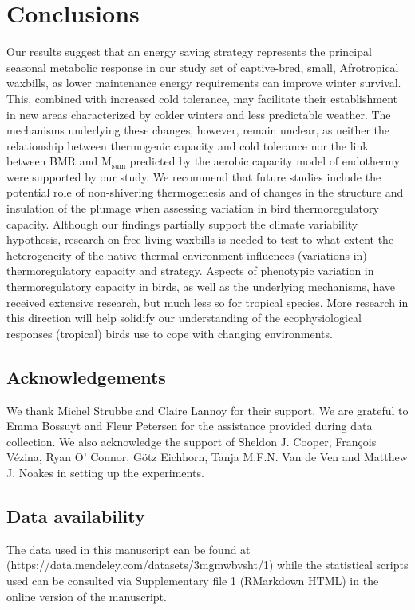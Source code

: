 \documentclass[10pt, twoside]{book} %
\begin{document}
\section{Conclusions}

Our results suggest that an energy saving strategy represents the principal seasonal metabolic response in our study set of captive-bred, small, Afrotropical waxbills, as lower maintenance energy requirements can improve winter survival. This, combined with increased cold tolerance, may facilitate their establishment in new areas characterized by colder winters and less predictable weather. The mechanisms underlying these changes, however, remain unclear, as neither the relationship between thermogenic capacity and cold tolerance nor the link between BMR and M$_{\text{sum}}$ predicted by the aerobic capacity model of endothermy were supported by our study. We recommend that future studies include the potential role of non-shivering thermogenesis and of changes in the structure and insulation of the plumage when assessing variation in bird thermoregulatory capacity. Although our findings partially support the climate variability hypothesis, research on free-living waxbills is needed to test to what extent the heterogeneity of the native thermal environment influences (variations in) thermoregulatory capacity and strategy. Aspects of phenotypic variation in thermoregulatory capacity in birds, as well as the underlying mechanisms, have received extensive research, but much less so for tropical species. More research in this direction will help solidify our understanding of the ecophysiological responses (tropical) birds use to cope with changing environments.


	\subsection*{Acknowledgements}

We thank Michel Strubbe and Claire Lannoy for their support. We are grateful to Emma Bossuyt and Fleur Petersen for the assistance provided during data collection. We also acknowledge the support of Sheldon J. Cooper, François Vézina, Ryan O’ Connor, Götz Eichhorn, Tanja M.F.N. Van de Ven and Matthew J. Noakes in setting up the experiments.

	\subsection*{Data availability}

The data used in this manuscript can be found at \newline
(https://data.mendeley.com/datasets/3mgmwbvsht/1) while the statistical scripts used can be consulted via Supplementary file 1 (RMarkdown HTML) in the online version of the manuscript. 
\end{document}
